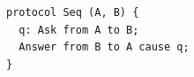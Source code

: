 \begin{lstlisting}[language={},basicstyle=\ttfamily\footnotesize,breaklines=true]
protocol Seq (A, B) {
  q: Ask from A to B;
  Answer from B to A cause q;
}
\end{lstlisting}
